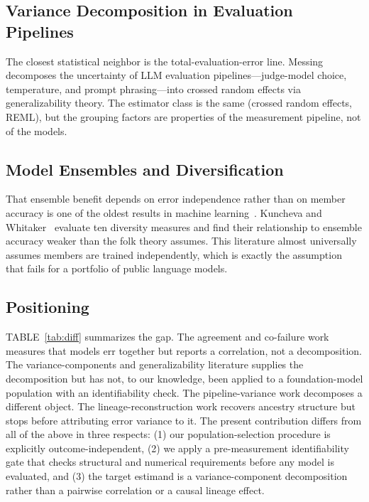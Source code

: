 \documentclass{ieeeaccess}
\theoremstyle{definition}
\theoremstyle{plain}
\begin{document}
\subsection{Variance Decomposition in Evaluation Pipelines}
The closest statistical neighbor is the total-evaluation-error line. Messing~\cite{messing2026} decomposes the uncertainty of LLM evaluation pipelines---judge-model choice, temperature, and prompt phrasing---into crossed random effects via generalizability theory. The estimator class is the same (crossed random effects, REML), but the grouping factors are properties of the measurement pipeline, not of the models.

\subsection{Model Ensembles and Diversification}
That ensemble benefit depends on error independence rather than on member accuracy is one of the oldest results in machine learning~\cite{dietterich2000,wolpert1992,breiman2001}. Kuncheva and Whitaker~\cite{kuncheva2003} evaluate ten diversity measures and find their relationship to ensemble accuracy weaker than the folk theory assumes. This literature almost universally assumes members are trained independently, which is exactly the assumption that fails for a portfolio of public language models.

\subsection{Positioning}
TABLE~\ref{tab:diff} summarizes the gap. The agreement and co-failure work measures that models err together but reports a correlation, not a decomposition. The variance-components and generalizability literature supplies the decomposition but has not, to our knowledge, been applied to a foundation-model population with an identifiability check. The pipeline-variance work decomposes a different object. The lineage-reconstruction work recovers ancestry structure but stops before attributing error variance to it. The present contribution differs from all of the above in three respects: (1) our population-selection procedure is explicitly outcome-independent, (2) we apply a pre-measurement identifiability gate that checks structural and numerical requirements before any model is evaluated, and (3) the target estimand is a variance-component decomposition rather than a pairwise correlation or a causal lineage effect.
\end{document}
